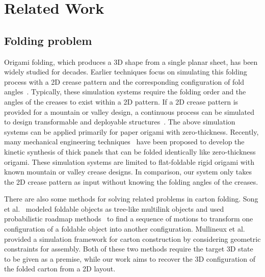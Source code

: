 \section{Related Work}\label{sec:relatedwork}
\subsection{Folding problem}

Origami folding, which produces a 3D shape from a single planar sheet, has been widely studied for decades. Earlier techniques focus on simulating this folding process with a 2D crease pattern and the corresponding configuration of fold angles~\cite{Thiel1998,Kishi:1998:OFP:786112.786279,Nimnual2007Virtual}. Typically, these simulation systems require the folding order and the angles of the creases to exist within a 2D pattern. 
%
If a 2D crease pattern is provided for a mountain or valley design, a continuous process can be simulated to design transformable and deployable structures~\cite{tachi2009simulation,tachigeometric}.
%
The above simulation systems can be applied primarily for paper origami with zero-thickness. Recently, many mechanical engineering techniques~\cite{tachi2011rigid,chen2015origami,2016arXiv160105747K} have been proposed to develop the kinetic synthesis of thick panels that can be folded identically like zero-thickness origami.
%
These simulation systems are limited to flat-foldable rigid origami with known mountain or valley crease designs. In comparison, our system only takes the 2D crease pattern as input without knowing the folding angles of the creases. 

 
There are also some methods for solving related problems in carton folding. 
Song et al.~\cite{Song:2000:MPA:892954} modeled foldable objects as tree-like multilink objects and used probabilistic roadmap methods~\cite{Kavraki:1994:PRP:891758} to find a sequence of motions to transform one configuration of a foldable object into another configuration. 
Mullineux et al.~\cite{Mullineux:2010:CSC:1739328.1739673} provided a simulation framework for carton construction by considering geometric constraints for assembly.
Both of these two methods require the target 3D state to be given as a premise, while our work aims to recover the 3D configuration of the folded carton from a 2D layout.


